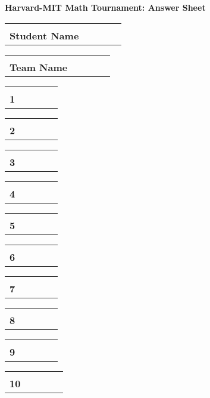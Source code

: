 \documentclass[11pt]{article}
\newcommand{\answerbox}[1]{
	\begin{tabularx}{\textwidth}{|X|XXXX|}
		\hline \\
		\LARGE \bfseries #1 &&&& \\[0.4in]
		\hline
	\end{tabularx}
	\par\vspace*{0.3in}
}
\begin{document}
\begin{center}
	\bfseries\LARGE
	Harvard-MIT Math Tournament: Answer Sheet \\[0.5in]
\end{center}

\answerbox{Student Name}
\answerbox{Team Name}

\begin{center}
	\begin{minipage}[t]{2.8in}
		\answerbox{1}
		\answerbox{2}
		\answerbox{3}
		\answerbox{4}
		\answerbox{5}
	\end{minipage}
	\hspace{0.7in}
	\begin{minipage}[t]{2.8in}
		\answerbox{6}
		\answerbox{7}
		\answerbox{8}
		\answerbox{9}
		\answerbox{10}
	\end{minipage}
\end{center}
\end{document}
